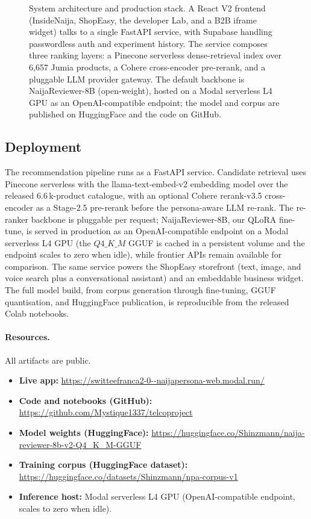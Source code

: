 \documentclass[sigconf,nonacm,balance]{acmart}
\begin{document}
\begin{figure}[!t]
\caption{System architecture and production stack. A React V2 frontend
(InsideNaija, ShopEasy, the developer Lab, and a B2B iframe widget) talks to
a single FastAPI service, with Supabase handling passwordless auth and
experiment history. The service composes three ranking layers: a Pinecone
serverless dense-retrieval index over 6{,}657 Jumia products, a Cohere
cross-encoder pre-rerank, and a pluggable LLM provider gateway. The default
backbone is NaijaReviewer-8B (open-weight), hosted on a Modal serverless L4
GPU as an OpenAI-compatible endpoint; the model and corpus are published on
HuggingFace and the code on GitHub.}
\label{fig:sysarch-b}
\end{figure}

\subsection{Deployment}
\label{sec:deploy}
The recommendation pipeline runs as a FastAPI service. Candidate retrieval
uses Pinecone serverless with the \textsf{llama-text-embed-v2} embedding model
over the released 6.6\,k-product catalogue, with an optional Cohere
\textsf{rerank-v3.5} cross-encoder as a Stage-2.5 pre-rerank before the
persona-aware LLM re-rank. The re-ranker backbone is pluggable per request;
NaijaReviewer-8B, our QLoRA fine-tune, is served in production as an
OpenAI-compatible endpoint on a Modal serverless L4 GPU (the $Q4\_K\_M$ GGUF
is cached in a persistent volume and the endpoint scales to zero when idle),
while frontier APIs remain available for comparison. The same service powers
the ShopEasy storefront (text, image, and voice search plus a conversational
assistant) and an embeddable business widget. The full model build, from
corpus generation through fine-tuning, GGUF quantisation, and HuggingFace
publication, is reproducible from the released Colab notebooks.

\paragraph{Resources.} All artifacts are public.
\begin{itemize}[leftmargin=*,nosep]
  \item \textbf{Live app:} \url{https://switteefranca2-0--naijapersona-web.modal.run/}
  \item \textbf{Code and notebooks (GitHub):}
        \url{https://github.com/Mystique1337/telcoproject}
  \item \textbf{Model weights (HuggingFace):}
        \url{https://huggingface.co/Shinzmann/naija-reviewer-8b-v2-Q4_K_M-GGUF}
  \item \textbf{Training corpus (HuggingFace dataset):}
        \url{https://huggingface.co/datasets/Shinzmann/npa-corpus-v1}
  \item \textbf{Inference host:} Modal serverless L4 GPU (OpenAI-compatible
        endpoint, scales to zero when idle).
\end{itemize}
\end{document}
